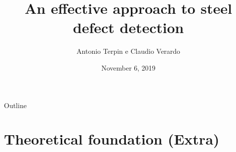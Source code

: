 \documentclass[usenames,dvipsnames,xcolor=table]{beamer}
\title[Steel defect detection]{An effective approach to steel defect detection}
\date[November 6, 2019]{November 6, 2019}
\author[Antonio Terpin e Claudio Verardo]{
  Antonio Terpin e Claudio Verardo
}
\institute{Scuola Superiore, University of Udine}
\begin{document}
\begin{frame}
\titlepage
\end{frame}

\begin{frame}{Outline}
\tableofcontents
\end{frame}

% 



\section{Theoretical foundation (Extra)}

% 







\end{document}
